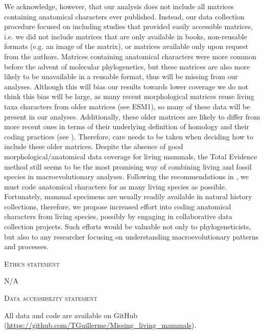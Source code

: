 \documentclass[12pt,letterpaper]{article}
\renewcommand{\section}[1]{%
\bigskip
\begin{center}
\begin{Large}
\normalfont\scshape #1
\medskip
\end{Large}
\end{center}}
\begin{document}
We acknowledge, however, that our analysis does not include all matrices containing anatomical characters ever published.
Instead, our data collection procedure focused on including studies that provided easily accessible matrices, i.e. we did not include matrices that are only available in books, non-reusable formats (e.g. an image of the matrix), or matrices available only upon request from the authors.
Matrices containing anatomical characters were more common before the advent of molecular phylogenetics, but these matrices are also more likely to be unavailable in a reusable format, thus will be missing from our analyses.
Although this will bias our results towards lower coverage we do not think this bias will be large, as many recent morphological matrices reuse living taxa characters from older matrices (see ESM1), so many of these data will be present in our analyses.
Additionally, these older matrices are likely to differ from more recent ones in terms of their underlying definition of homology and their coding practices (see \cite{Brazeau2011}).
Therefore, care needs to be taken when deciding how to include these older matrices.
Despite the absence of good morphological/anatomical data coverage for living mammals, the Total Evidence method still seems to be the most promising way of combining living and fossil species in macroevolutionary analyses.
Following the recommendations in \cite{GuillermeCooper}, we must code anatomical characters for as many living species as possible. 
Fortunately, mammal specimens are usually readily available in natural history collections, therefore, we propose increased effort into coding anatomical characters from living species, possibly by engaging in collaborative data collection projects.
Such efforts would be valuable not only to phylogeneticists, but also to any researcher focusing on understanding macroevolutionary patterns and processes.

\section{Ethics statement}
N/A
\section{Data accessibility statement}
All data and code are available on GitHub (\url{https://github.com/TGuillerme/Missing_living_mammals}).
\end{document}

